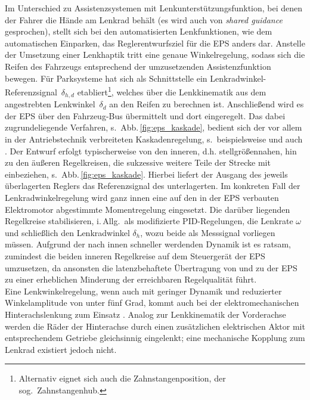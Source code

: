 Im Unterschied zu Assistenzsystemen mit Lenkunterstützungsfunktion, bei denen der Fahrer die Hände am Lenkrad behält (es wird auch von \emph{shared guidance} \cite{Brandt2008} gesprochen), stellt sich bei den automatisierten Lenkfunktionen, wie dem automatischen Einparken, das Reglerentwurfsziel für die EPS anders dar. Anstelle der Umsetzung einer Lenkhaptik tritt eine genaue Winkelregelung, sodass sich die Reifen des Fahrzeugs entsprechend der umzusetzenden Assistenzfunktion bewegen. Für Parksysteme hat sich als Schnittstelle ein Lenkradwinkel-Referenzsignal~$\delta_{h,d}$ etabliert\footnote{Alternativ eignet sich auch die Zahnstangenposition, der sog.\ Zahnstangenhub.}, welches über die Lenkkinematik aus dem angestrebten Lenkwinkel~$\delta_{d}$ an den Reifen zu berechnen ist. Anschließend wird es der EPS über den Fahrzeug-Bus übermittelt und dort eingeregelt. 
Das dabei zugrundeliegende Verfahren, s.\ Abb.\,\ref{fig:eps_kaskade}, bedient sich der vor allem in der Antriebstechnik verbreiteten Kaskadenregelung, s.\ beispielsweise \cite{graf2003neue} und auch . Der Entwurf erfolgt typischerweise von den inneren, d.h. stellgrößennahen, hin zu den äußeren Regelkreisen, die sukzessive weitere Teile der Strecke mit einbeziehen, s.\ Abb.\,\ref{fig:eps_kaskade}. Hierbei liefert der Ausgang des jeweils überlagerten Reglers das Referenzsignal des unterlagerten. Im konkreten Fall der Lenkradwinkelregelung wird ganz innen eine auf den in der EPS verbauten Elektromotor abgestimmte Momentregelung eingesetzt. Die darüber liegenden Regelkreise stabilisieren, i.\,Allg.\ als modifizierte PID-Regelungen, die Lenkrate $\omega$ und schließlich den Lenkradwinkel $\delta_h$, wozu beide als Messsignal vorliegen müssen. %
Aufgrund der nach innen schneller werdenden Dynamik ist es ratsam, zumindest die beiden inneren Regelkreise auf dem Steuergerät der EPS umzusetzen, da ansonsten die latenzbehaftete Übertragung von und zu der EPS zu einer erheblichen Minderung der erreichbaren Regelqualität führt. \\
%
Eine Lenkwinkelregelung, wenn auch mit geringer Dynamik und reduzierter Winkelamplitude von unter fünf Grad, kommt auch bei der elektromechanischen Hinterachslenkung zum Einsatz \cite{pfeffer2013lenkungshandbuch}. Analog zur Lenkkinematik der Vorderachse werden die Räder der Hinterachse durch einen zusätzlichen elektrischen Aktor mit entsprechendem Getriebe gleichsinnig eingelenkt; eine mechanische Kopplung zum Lenkrad existiert jedoch nicht. %


